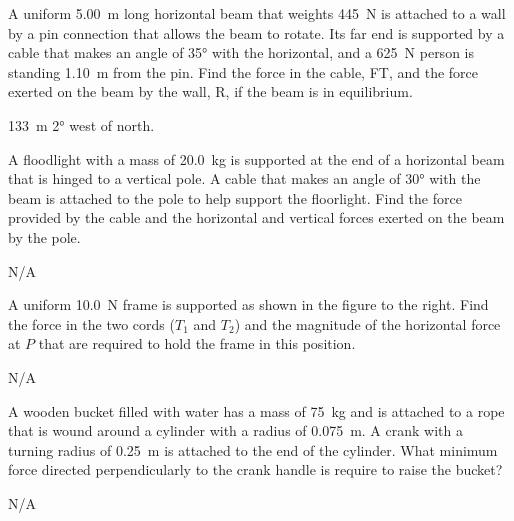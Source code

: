 


\begin{question}[ID=torque-A-Q01,topic=torque,difficulty=A]
    A uniform \SI{5.00}{\meter} long horizontal beam that
        weights \SI{445}{\newton} is attached to a wall
        by a pin connection that allows the beam to rotate.
    Its far end is supported by a cable that makes an angle
        of \ang{35} with the horizontal, and a \SI{625}{\newton}
        person is standing \SI{1.10}{\meter} from the pin.
    Find the force in the cable, FT, and the force exerted
        on the beam by the wall, R, if the beam is in equilibrium.
\end{question}
\begin{solution}
    \SI{133}{\meter} \ang{2} west of north.
\end{solution}


\begin{question}[ID=torque-A-Q02,topic=torque,difficulty=A]
    A floodlight with a mass of \SI{20.0}{\kilo\gram} is supported
        at the end of a horizontal beam that is hinged to a vertical pole.
    A cable that makes an angle of \ang{30} with the beam is attached to
        the pole to help support the floorlight.
    Find the force provided by the cable and the horizontal and vertical
        forces exerted on the beam by the pole.
\end{question}
\begin{solution}
    N/A
\end{solution}


\begin{question}[ID=torque-A-Q03,topic=torque,difficulty=A]
    A uniform \SI{10.0}{\newton} frame is supported as shown in the
        figure to the right.
    Find the force in the two cords ($T_1$ and $T_2$) and the magnitude
        of the horizontal force at $P$ that are required to hold the frame
        in this position.
\end{question}
\begin{solution}
    N/A
\end{solution}


\begin{question}[ID=torque-B-Q01,topic=torque,difficulty=B]
    A wooden bucket filled with water has a mass of \SI{75}{\kilo\gram}
        and is attached to a rope that is wound around a cylinder with
        a radius of \SI{0.075}{\meter}.
    A crank with a turning radius of \SI{0.25}{\meter} is attached to
        the end of the cylinder.
    What minimum force directed perpendicularly to the crank handle
        is require to raise the bucket?
\end{question}
\begin{solution}
    N/A
\end{solution}


